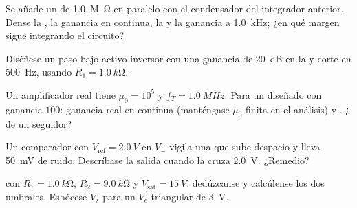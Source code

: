 \begin{exercise}[$\star\star$]\label{exo:b1:operational-amplifier:7}
Se añade un  de \qty{1.0}{M\ohm} en paralelo con el condensador
del integrador anterior. Dense la , la ganancia en
continua, la  y la ganancia a \qty{1.0}{kHz}; ¿en qué
margen sigue integrando el circuito?
\end{exercise}

\begin{exercise}[$\star\star$]\label{exo:b1:operational-amplifier:8}
Diséñese un paso bajo activo inversor con una ganancia de \qty{20}{dB} en
la  y corte en \qty{500}{Hz}, usando $R_1 = \qty{1.0}{k\ohm}$.
\end{exercise}

\begin{exercise}[$\star\star$]\label{exo:b1:operational-amplifier:9}
Un amplificador real tiene $\mu_0 = 10^5$ y $f_T = \qty{1.0}{MHz}$. Para
un  diseñado con ganancia $100$: ganancia real en
continua (manténgase $\mu_0$ finita en el análisis) y .
¿ de un seguidor?
\end{exercise}

\begin{exercise}[$\star\star\star$]\label{exo:b1:operational-amplifier:10}
Un comparador con $V_{\mathrm{ref}} = \qty{2.0}{V}$ en $V_-$ vigila una
 que sube despacio y lleva \qty{50}{mV} de ruido. Descríbase la
salida cuando la  cruza \qty{2.0}{V}. ¿Remedio?
\end{exercise}

\begin{exercise}[$\star\star\star$]\label{exo:b1:operational-amplifier:11}
 con $R_1 = \qty{1.0}{k\ohm}$, $R_2 = \qty{9.0}{k\ohm}$
y $V_{\mathrm{sat}} = \qty{15}{V}$: dedúzcanse y calcúlense los dos
umbrales. Esbócese $V_s$ para un $V_e$ triangular de  \qty{3}{V}.
\end{exercise}

